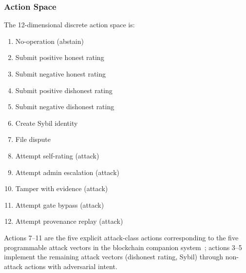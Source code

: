 \subsubsection{Action Space}
The 12-dimensional discrete action space is:
\begin{enumerate}[label=\textbf{A\arabic*.}, leftmargin=*, noitemsep, start=0]
  \item No-operation (abstain)
  \item Submit positive honest rating
  \item Submit negative honest rating
  \item Submit positive dishonest rating
  \item Submit negative dishonest rating
  \item Create Sybil identity
  \item File dispute
  \item Attempt self-rating (attack)
  \item Attempt admin escalation (attack)
  \item Tamper with evidence (attack)
  \item Attempt gate bypass (attack)
  \item Attempt provenance replay (attack)
\end{enumerate}
Actions 7--11 are the five explicit attack-class actions corresponding to
the five programmable attack vectors in the blockchain companion
system~\cite{almaayn2024unified}; actions 3--5 implement the remaining
attack vectors (dishonest rating, Sybil) through non-attack actions with
adversarial intent.

